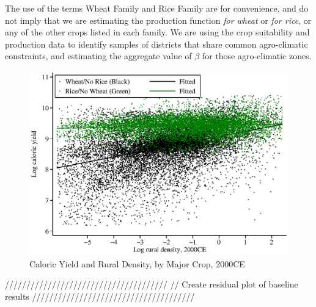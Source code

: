 The use of the terms Wheat Family and Rice Family are for convenience, and do not imply that we are estimating the production function \textit{for wheat} or \textit{for rice}, or any of the other crops listed in each family. We are using the crop suitability and production data to identify samples of districts that share common agro-climatic constraints, and estimating the aggregate value of $\beta$ for those agro-climatic zones.

\clearpage


\begin{figure}[!htb]
\begin{center}
\caption{Caloric Yield and Rural Density, by Major Crop, 2000CE}
\label{FIG_beta_crop}
\includegraphics[width=1.0\textwidth]{fig_beta_crop.eps}
\end{center}
\vspace{-.5cm}
\end{figure}


//////////////////////////////////////
// Create residual plot of baseline results
//////////////////////////////////////

